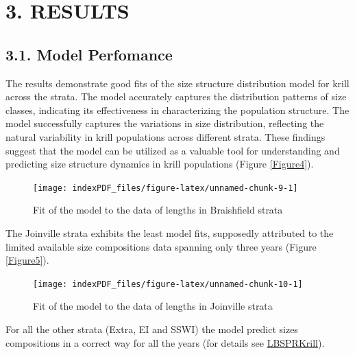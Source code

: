 \documentclass[
]{article}
\begin{document}
\newpage

\hypertarget{results}{%
\section{3. RESULTS}\label{results}}

\hypertarget{model-perfomance}{%
\subsection{3.1. Model Perfomance}\label{model-perfomance}}

The results demonstrate good fits of the size structure distribution
model for krill across the strata. The model accurately captures the
distribution patterns of size classes, indicating its effectiveness in
characterizing the population structure. The model successfully captures
the variations in size distribution, reflecting the natural variability
in krill populations across different strata. These findings suggest
that the model can be utilized as a valuable tool for understanding and
predicting size structure dynamics in krill populations (Figure
\ref{Figure4}).

\begin{figure}[H]

{\centering \texttt{[image: indexPDF\_files/figure-latex/unnamed-chunk-9-1]} 

}

\caption{\label{Figure4}Fit of the model to the data of lengths in Braishfield strata}\label{fig:unnamed-chunk-9}
\end{figure}

The Joinville strata exhibits the least model fits, supposedly
attributed to the limited available size compositions data spanning only
three years (Figure \ref{Figure5}).

\begin{figure}[H]

{\centering \texttt{[image: indexPDF\_files/figure-latex/unnamed-chunk-10-1]} 

}

\caption{\label{Figure5}Fit of the model to the data of lengths in Joinville strata}\label{fig:unnamed-chunk-10}
\end{figure}

For all the other strata (Extra, EI and SSWI) the model predict sizes
compositions in a correct way for all the years (for details see
\href{https://github.com/MauroMardones/LBSPR_Krill}{LBSPRKrill}).
\end{document}
